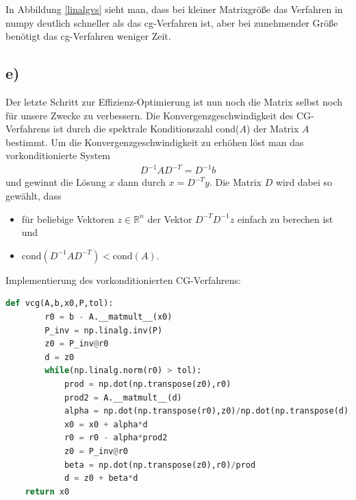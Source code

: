 In Abbildung \ref{linalgvs}  sieht man, dass bei kleiner Matrixgröße das Verfahren in numpy deutlich schneller als das cg-Verfahren ist, aber bei zunehmender Größe benötigt das cg-Verfahren weniger Zeit.

\subsection*{e)}
Der letzte Schritt zur Effizienz-Optimierung ist nun noch die Matrix selbst noch für unsere Zwecke zu verbessern.
Die Konvergenzgeschwindigkeit des CG-Verfahrens ist durch die spektrale Konditionszahl cond($A$) der Matrix $A$ bestimmt.
Um die Konvergenzgeschwindigkeit zu erhöhen löst man das vorkonditionierte System
\begin{align*}
  D^{-1}AD^{-T} = D^{-1}b
\end{align*}
und gewinnt die Lösung $x$ dann durch $x = D^{-T}y$. Die Matrix $D$ wird dabei so gewählt, dass
\begin{itemize}
\item für beliebige Vektoren $z \in \mathbb{R}^n$ der Vektor $D^{-T}D^{-1}z$ einfach zu berechen ist und
\item $\text{cond}(D^{-1}AD^{-T}) < \text{cond}(A)$.
\end{itemize}
Implementierung des vorkonditionierten CG-Verfahrens:
\begin{lstlisting}[language=Python]
    def vcg(A,b,x0,P,tol):
        r0 = b - A.__matmult__(x0)
        P_inv = np.linalg.inv(P)
        z0 = P_inv@r0
        d = z0
        while(np.linalg.norm(r0) > tol):
            prod = np.dot(np.transpose(z0),r0)
            prod2 = A.__matmult__(d)
            alpha = np.dot(np.transpose(r0),z0)/np.dot(np.transpose(d),prod2)
            x0 = x0 + alpha*d
            r0 = r0 - alpha*prod2
            z0 = P_inv@r0
            beta = np.dot(np.transpose(z0),r0)/prod
            d = z0 + beta*d
    return x0
\end{lstlisting}

